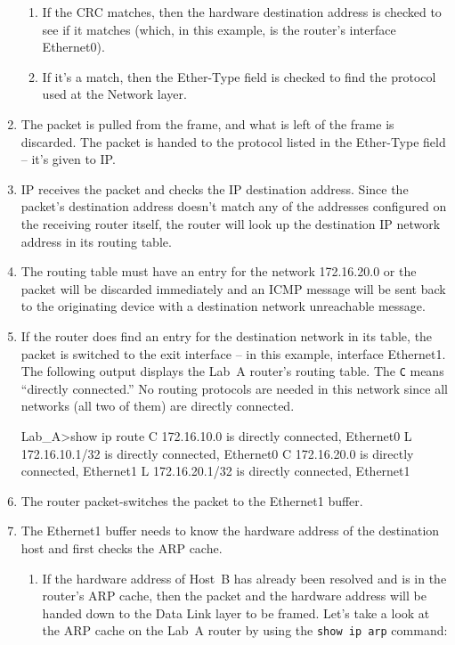 \begin{enumerate}
  \begin{enumerate}
  \item
    If the CRC matches, then the hardware destination address is checked
    to see if it matches (which, in this example, is the router's
    interface Ethernet0).
  \item
    If it's a match, then the Ether-Type field is checked to find the
    protocol used at the Network layer.
  \end{enumerate}
\item
  The packet is pulled from the frame, and what is left of the frame is
  discarded. The packet is handed to the protocol listed in the
  Ether-Type field -- it's given to IP.
\item
  IP receives the packet and checks the IP destination address. Since
  the packet's destination address doesn't match any of the addresses
  configured on the receiving router itself, the router will look up the
  destination IP network address in its routing table.
\item
  The routing table must have an entry for the network 172.16.20.0 or
  the packet will be discarded immediately and an ICMP message will be
  sent back to the originating device with a destination network
  unreachable message.
\item
   If the router does find an entry for the destination network in its   table, the packet is switched to the exit interface -- in this example, interface Ethernet1.
   The following output displays the Lab~A router's routing table.
   The \texttt{C} means ``directly connected.''
   No routing protocols are needed in this network since all networks (all two of them) are directly connected.

\begin{cli}
Lab_A>show ip route
C       172.16.10.0 is directly connected,    Ethernet0
L       172.16.10.1/32 is directly connected, Ethernet0
C       172.16.20.0 is directly connected,    Ethernet1
L       172.16.20.1/32 is directly connected, Ethernet1
\end{cli}
\item
   The router packet-switches the packet to the Ethernet1 buffer.
\item
   The Ethernet1 buffer needs to know the hardware address of the destination host and first checks the ARP cache.

  \begin{enumerate}
  \item
    If the hardware address of Host~B has already been resolved and is
    in the router's ARP cache, then the packet and the hardware address
    will be handed down to the Data Link layer to be framed. Let's take
    a look at the ARP cache on the Lab~A router by using the
    \texttt{show\ ip\ arp} command:


\end{enumerate}
\end{enumerate}

